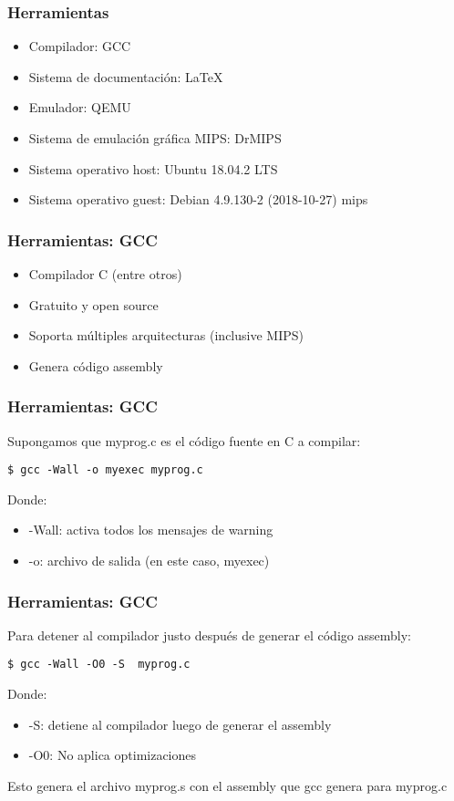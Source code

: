 \documentclass{beamer}
\begin{document}
\begin{frame}
 \frametitle{Herramientas}
 \begin{itemize}
  \item  Compilador: GCC
  \item Sistema de documentación: \LaTeX
  \item Emulador: QEMU
  \item Sistema de emulación gráfica MIPS: DrMIPS
  \item Sistema operativo host: Ubuntu 18.04.2 LTS 
  \item Sistema operativo guest: Debian 4.9.130-2 (2018-10-27) mips
 \end{itemize}
 \end{frame}
 
 \begin{frame}
 \frametitle{Herramientas: GCC}
 \begin{itemize} 
    \item Compilador C (entre otros)
    \item Gratuito y open source
    \item Soporta múltiples arquitecturas (inclusive MIPS)
    \item Genera código assembly
  \end{itemize}
 \end{frame}
 
\begin{frame}[fragile]
 \frametitle{Herramientas: GCC}
 Supongamos que myprog.c es el código
fuente en C a compilar:
\begin{verbatim}
$ gcc -Wall -o myexec myprog.c
\end{verbatim}

Donde:
\begin{itemize}
 \item -Wall: activa todos los mensajes de warning
\item -o: archivo de salida (en este caso, myexec)
\end{itemize}
 \end{frame}
  
 
\begin{frame}[fragile]
 \frametitle{Herramientas: GCC}
Para detener al compilador justo
después de generar el código assembly:
\begin{verbatim}
$ gcc -Wall -O0 -S  myprog.c
\end{verbatim}

Donde:
\begin{itemize}
 \item -S: detiene al compilador luego de generar el assembly
\item -O0: No aplica optimizaciones
\end{itemize}

Esto genera el archivo myprog.s con el assembly
que gcc genera para myprog.c
 \end{frame}
  
\end{document}

